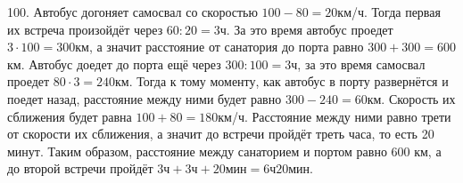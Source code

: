 100. Автобус догоняет самосвал со скоростью $100-80=20$км/ч. Тогда первая их встреча произойдёт через $60:20=3$ч. За это время автобус проедет $3\cdot100=300$км, а значит расстояние от санатория до порта равно $300+300=600$км. Автобус доедет до порта ещё через $300:100=3$ч, за это время самосвал проедет $80\cdot3=240$км. Тогда к тому моменту, как автобус в порту развернётся и поедет назад, расстояние между ними будет равно $300-240=60$км. Скорость их сближения будет равна $100+80=180$км/ч. Расстояние между ними равно трети от скорости их сближения, а значит до встречи пройдёт треть часа, то есть 20 минут. Таким образом, расстояние между санаторием и портом равно 600 км, а до второй встречи пройдёт $3\text{ч}+3\text{ч}+20\text{мин}=6\text{ч}20\text{мин}.$\\
